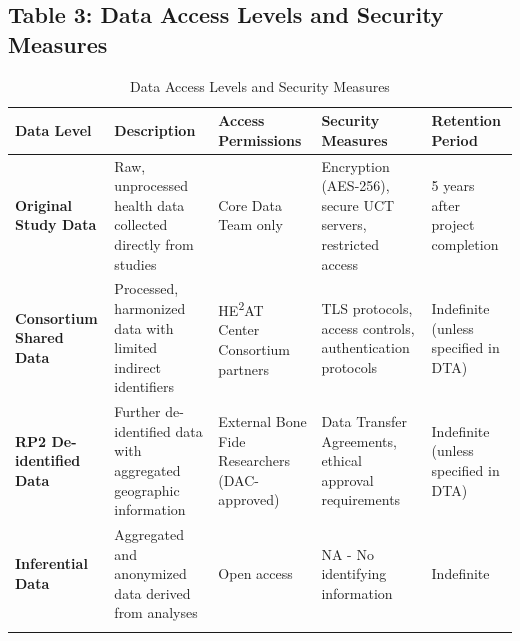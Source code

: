 \documentclass[12pt,a4paper,landscape]{article}
\begin{document}
\subsection*{Table 3: Data Access Levels and Security Measures}
\begin{longtable}{L{3.5cm}L{5cm}L{4.5cm}L{4cm}L{3cm}}
\toprule
\textbf{Data Level} & \textbf{Description} & \textbf{Access Permissions} & \textbf{Security Measures} & \textbf{Retention Period} \\
\midrule
\endhead

\textbf{Original Study Data} 
& Raw, unprocessed health data collected directly from studies 
& Core Data Team only 
& Encryption (AES-256), secure UCT servers, restricted access 
& 5 years after project completion \\
\midrule

\textbf{Consortium Shared Data} 
& Processed, harmonized data with limited indirect identifiers 
& HE\textsuperscript{2}AT Center Consortium partners 
& TLS protocols, access controls, authentication protocols 
& Indefinite (unless specified in DTA) \\
\midrule

\textbf{RP2 De-identified Data} 
& Further de-identified data with aggregated geographic information 
& External Bone Fide Researchers (DAC-approved) 
& Data Transfer Agreements, ethical approval requirements 
& Indefinite (unless specified in DTA) \\
\midrule

\textbf{Inferential Data} 
& Aggregated and anonymized data derived from analyses 
& Open access 
& NA - No identifying information 
& Indefinite \\
\bottomrule
\caption{Data Access Levels and Security Measures}
\end{longtable}
\clearpage

\end{document}
